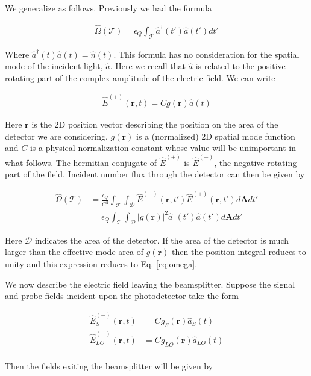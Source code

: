 \documentclass[12pt]{article}
\newcommand{\ep}{\epsilon}
\newcommand{\bv}[1]{\boldsymbol{#1}}
\newcommand{\mc}[1]{\mathcal{#1}}
\begin{document}
We generalize as follows. Previously we had the formula

\begin{align}
\label{eq:omega}
\hat{\Omega}(\mc{T}) = \ep_Q \int_{\mc{T}} \hat{a}^{\dag}(t')\hat{a}(t') dt'
\end{align}

Where $\hat{a}^{\dag}(t)\hat{a}(t) = \hat{n}(t)$. This formula has no consideration for the spatial mode of the incident light, $\hat{a}$. Here we recall that $\hat{a}$ is related to the positive rotating part of the complex amplitude of the electric field. We can write

\begin{align}
\hat{E}^{(+)}(\bv{r}, t) = Cg(\bv{r})\hat{a}(t)
\end{align}

Here $\bv{r}$ is the 2D position vector describing the position on the area of the detector we are considering, $g(\bv{r})$ is a (normalized) 2D spatial mode function and $C$ is a physical normalization constant whose value will be unimportant in what follows. The hermitian conjugate of $\hat{E}^{(+)}$ is $\hat{E}^{(-)}$, the negative rotating part of the field. Incident number flux through the detector can then be given by

\begin{align}
\hat{\Omega}(\mc{T}) &= \frac{\ep_Q}{C^2}\int_{\mc{T}}\int_{\mc{D}} \hat{E}^{(-)}(\bv{r}, t')\hat{E}^{(+)}(\bv{r}, t')d\bv{A}dt'\\
&= \ep_Q \int_{\mc{T}} \int_{\mc{D}} |g(\bv{r})|^2 \hat{a}^{\dag}(t')\hat{a}(t')d\bv{A} dt'
\end{align}

Here $\mc{D}$ indicates the area of the detector. If the area of the detector is much larger than the effective mode area of $g(\bv{r})$ then the position integral reduces to unity and this expression reduces to Eq. \eqref{eq:omega}.

We now describe the electric field leaving the beamsplitter. Suppose the signal and probe fields incident upon the photodetector take the form

\begin{align}
\hat{E}^{(-)}_S(\bv{r},t) &= Cg_S(\bv{r})\hat{a}_S(t)\\
\hat{E}^{(-)}_{LO}(\bv{r},t) &= Cg_{LO}(\bv{r})\hat{a}_{LO}(t)\\
\end{align}

Then the fields exiting the beamsplitter will be given by
\end{document}
